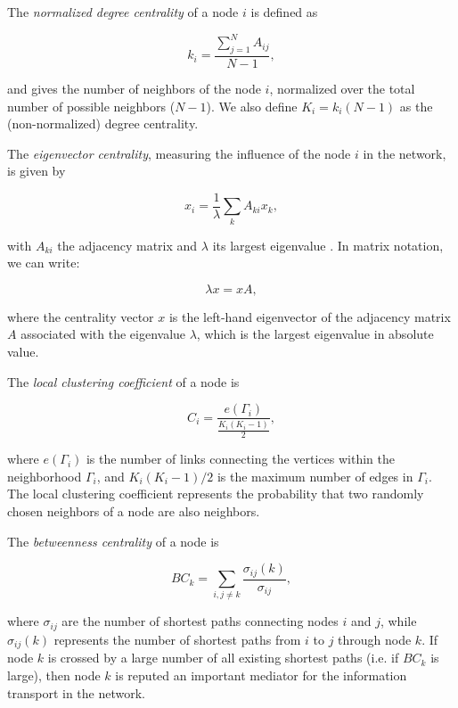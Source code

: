 \documentclass{ws-ijbc}
\begin{document}
\noindent The \emph{normalized degree centrality} of a node $i$ is defined as

\begin{equation}
\label{dc} k_i = \frac{\sum\limits_{j=1}^N A_{ij}}{N-1},
\end{equation}

\noindent and gives the number of neighbors of the node $i$, normalized over the total number of possible neighbors ($N-1$). We also define $K_i = k_i (N-1)$ as the (non-normalized) degree centrality.

\noindent The \emph{eigenvector centrality}, measuring the influence of the node $i$ in the network, is given by

\begin{equation}
x_i = \frac{1}{\lambda} \sum_k A_{ki} x_k,
\end{equation}

\noindent with $A_{ki}$ the adjacency matrix and $\lambda$ its largest eigenvalue \cite{newman2010}. In matrix notation, we can write:

\begin{equation}
{\lambda} x = x A,
\end{equation}

\noindent where the centrality vector $x$ is the left-hand eigenvector of the adjacency matrix $A$ associated with the eigenvalue $\lambda$, which is the largest eigenvalue in absolute value.

\noindent The \emph{local clustering coefficient} of a node is

\begin{equation}
C_i = \frac{e(\Gamma_i)}{\frac{K_i(K_i-1)}{2}},
\end{equation}

\noindent where $e(\Gamma_i)$ is the number of links connecting the vertices within the neighborhood $\Gamma_i$, and $K_i(K_i-1)/2$ is the maximum number of edges in $\Gamma_i$. The local clustering coefficient represents the probability that two randomly chosen neighbors of a node are also neighbors.

\noindent The \emph{betweenness centrality} of a node is

\begin{equation}
BC_k = \sum_{i,j \neq k} \frac{\sigma_{ij}(k)}{\sigma_{ij}},
\end{equation}

\noindent where $\sigma_{ij}$ are the number of shortest paths connecting nodes $i$ and $j$, while $\sigma_{ij}(k)$ represents the number of shortest paths from $i$ to $j$ through node $k$. If node $k$ is crossed by a large number of all existing shortest paths (i.e. if $BC_k$ is large), then node $k$ is reputed an important mediator for the information transport in the network.
\end{document}
